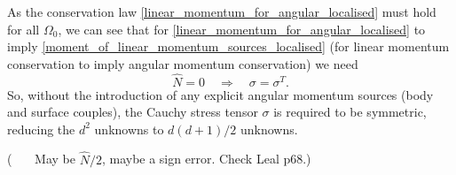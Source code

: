 As the conservation law \eqref{linear_momentum_for_angular_localised} must hold for all $\Omega_0$, we can see that for \eqref{linear_momentum_for_angular_localised}
to imply \eqref{moment_of_linear_momentum_sources_localised} (for linear momentum conservation to imply angular momentum conservation) we need
\begin{equation}
    \widehat{N} = 0 \quad\Rightarrow\quad \sigma = \sigma^T.
\end{equation}
So, without the introduction of any explicit angular momentum sources (body and surface couples), the Cauchy stress tensor $\sigma$ is required to be symmetric,
reducing the $d^2$ unknowns to $d(d+1)/2$ unknowns.

(~~~ May be $\widehat{N}/2$, maybe a sign error. Check Leal p68.)




